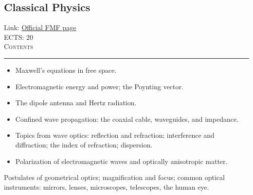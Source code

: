 \documentclass[11pt, a4paper]{article}
\newenvironment{course}[3]{
\subsection{#1}%
Link: \href{#2}{Official FMF page}\\%
ECTS: #3%
\vspace{1ex}
\\
{\large \textsc{Contents}}\\[-0.9ex]%
\rule{\textwidth}{0.5pt}
\vspace{-3ex}
}
{}
\newenvironment{chapter}[1]{
\begin{tcolorbox}[title=#1, breakable]
}
{\end{tcolorbox}}
\begin{document}
\begin{course}{Classical Physics}{https://www.fmf.uni-lj.si/en/study-physics/programmes/1fiz/2020/7000777/courses/1154/}{20}
\begin{chapter}{Electromagnetic wave propagation}
    \begin{itemize}

        \item Maxwell’s equations in free space.

        \item Electromagnetic energy and power; the Poynting vector.

        \item The dipole antenna and Hertz radiation.

        \item Confined wave propagation: the coaxial cable, waveguides, and impedance.

        \item Topics from wave optics: reflection and refraction; interference and diffraction; the index of refraction; dispersion.

        \item Polarization of electromagnetic waves and optically anisotropic matter.

    \end{itemize}
\end{chapter}

\begin{chapter}{Geometrical optics}
    Postulates of geometrical optics; magnification and focus; common optical instruments: mirrors, lenses, microscopes, telescopes, the human eye.
\end{chapter}

\end{course}
\end{document}

